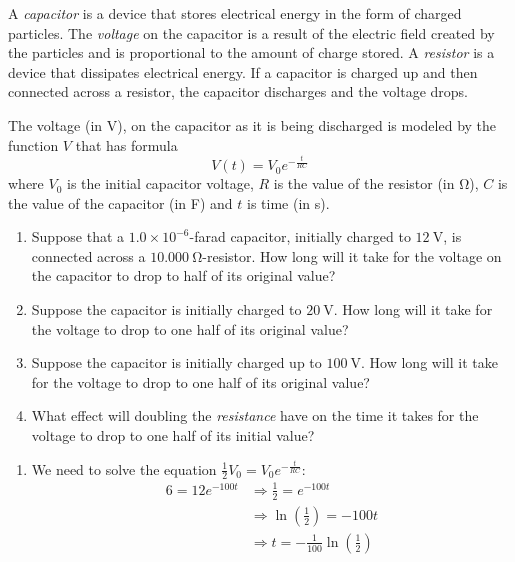 \begin{pccexample}
	A \emph{capacitor} is a device that stores electrical energy in the form of charged particles.
	The \emph{voltage} on the capacitor is a result of the electric field created by the particles and
	is proportional to the amount of charge stored. A \emph{resistor} is a device that dissipates
	electrical energy. If a capacitor is charged up and then connected across a resistor, the
	capacitor discharges and the voltage drops.
	
	The voltage (in \si{\volt}), on the capacitor as it is being discharged is modeled by the
	function $V$ that has formula 
	\[
		V(t)=V_0e^{-\frac{t}{RC}}
	\]
	where $V_0$ is the initial capacitor voltage, $R$ is the value of the
	resistor (in \si{\ohm}), $C$ is the value of the capacitor (in \si{\farad}) and $t$ is time (in \si{\second}).
	\begin{enumerate}
		\item Suppose that a $1.0\times 10^{-6}$-farad capacitor, initially charged to 
		$\SI{12}{\volt}$, is connected across a $\SI{10,000}{\ohm}$-resistor. 
		How long will it take for the voltage on the capacitor to drop to half 
		of its original value?
		\item Suppose the capacitor is initially charged to $\SI{20}{\volt}$. How long
		will it take for the voltage to drop to one half of its original value?
		\item Suppose the capacitor is initially charged up to $\SI{100}{\volt}$. How 
		long will it take for the voltage to drop to one half of its original value?
		\item What effect will doubling the \emph{resistance} have on the time it takes for the voltage to
		drop to one half of its initial value?
	\end{enumerate}
	\begin{pccsolution}
		\begin{enumerate}
			\item We need to solve the equation $\frac{1}{2}V_0=V_0e^{-\frac{t}{RC}}$:
			\begin{align*}
				6 = 12 e^{-100t} & \Rightarrow \frac{1}{2}=e^{-100t}                       \\
				                 & \Rightarrow \ln\left(\frac{1}{2}\right)=-100t           \\
				                 & \Rightarrow t=-\frac{1}{100}\ln\left(\frac{1}{2}\right) \\

\end{align*}
\end{enumerate}
\end{pccsolution}
\end{pccexample}
